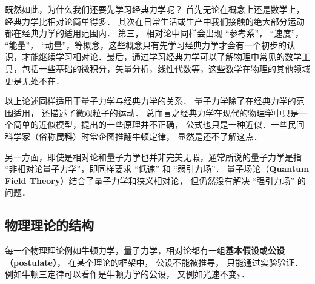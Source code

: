 既然如此，为什么我们还要先学习经典力学呢？ 首先无论在概念上还是数学上，经典力学比相对论简单得多． 其次在日常生活或生产中我们接触的绝大部分运动都在经典力学的适用范围内． 第三， 相对论中同样会出现 “参考系”， “速度”， “能量”， “动量”，等概念，这些概念只有先学习经典力学才会有一个初步的认识，才能继续学习相对论．最后，通过学习经典力学可以了解物理中常见的数学工具，包括一些基础的微积分，矢量分析，线性代数等，这些数学在物理的其他领域更是无处不在．

以上论述同样适用于量子力学与经典力学的关系． 量子力学除了在经典力学的范围适用， 还描述了微观粒子的运动． 总而言之经典力学在现代的物理学中只是一个简单的近似模型，提出的一些原理并不正确， 公式也只是一种近似．一些民间科学家（俗称\textbf{民科}）时常企图推翻牛顿定律， 显然是还不了解这点．

另一方面，即使是相对论和量子力学也并非完美无瑕，通常所说的量子力学是指 “非相对论量子力学”，即同样要求 “低速” 和 “弱引力场”． 量子场论（\textbf{Quantum Field Theory}）结合了量子力学和狭义相对论， 但仍然没有解决 “强引力场” 的问题．

\subsection{物理理论的结构}
每一个物理理论例如牛顿力学，量子力学，相对论都有一组\textbf{基本假设}或\textbf{公设（postulate）}， 在某个理论的框架中， 公设不能被推导， 只能通过实验验证． 例如牛顿三定律可以看作是牛顿力学的公设， 又例如光速不变y．
